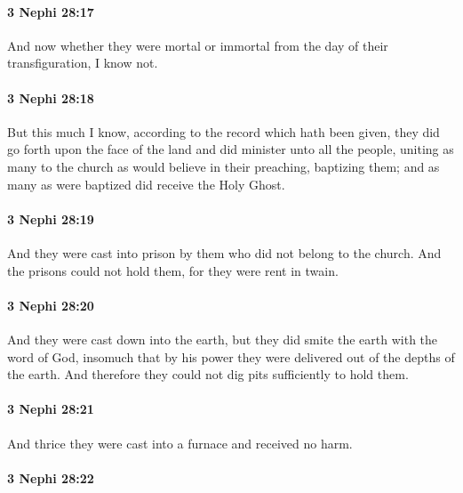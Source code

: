 		\paragraph{3 Nephi 28:17} %
			\label{3NEPHI-28-17}

			And now whether they were mortal or immortal
			from the day of their transfiguration,
			I know not.

		\paragraph{3 Nephi 28:18} %
			\label{3NEPHI-28-18}

			But this much I know,
			according to the record which hath been given,
			they did go forth upon the face of the land
			and did minister unto all the people,
			uniting as many to the church as would believe in their preaching,
			baptizing them;
			and as many as were baptized did receive the Holy Ghost.

		\paragraph{3 Nephi 28:19} %
			\label{3NEPHI-28-19}

			And they were cast into prison by them who did not belong to the church.
			And the prisons could not hold them,
			for they were rent in twain.

		\paragraph{3 Nephi 28:20} %
			\label{3NEPHI-28-20}

			And they were cast down into the earth,
			but they did smite the earth with the word of God,
			insomuch that by his power they were delivered out of the depths of the earth.
			And therefore they could not dig pits sufficiently to hold them.

		\paragraph{3 Nephi 28:21} %
			\label{3NEPHI-28-21}

			And thrice they were cast into a furnace and received no harm.

		\paragraph{3 Nephi 28:22} %
			\label{3NEPHI-28-22}

